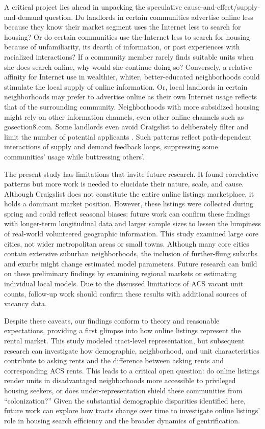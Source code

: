 \documentclass[11pt,letterpaper]{article}
\begin{document}
A critical project lies ahead in unpacking the speculative cause-and-effect/supply-and-demand question. Do landlords in certain communities advertise online less because they know their market segment uses the Internet less to search for housing? Or do certain communities use the Internet less to search for housing because of unfamiliarity, its dearth of information, or past experiences with racialized interactions? If a community member rarely finds suitable units when she does search online, why would she continue doing so? Conversely, a relative affinity for Internet use in wealthier, whiter, better-educated neighborhoods could stimulate the local supply of online information. Or, local landlords in certain neighborhoods may prefer to advertise online as their own Internet usage reflects that of the surrounding community. Neighborhoods with more subsidized housing might rely on other information channels, even other online channels such as gosection8.com. Some landlords even avoid Craigslist to deliberately filter and limit the number of potential applicants \citep{mendez_professional_2016}. Such patterns reflect path-dependent interactions of supply and demand feedback loops, suppressing some communities' usage while buttressing others'.

The present study has limitations that invite future research. It found correlative patterns but more work is needed to elucidate their nature, scale, and cause. Although Craigslist does not constitute the entire online listings marketplace, it holds a dominant market position. However, these listings were collected during spring and could reflect seasonal biases: future work can confirm these findings with longer-term longitudinal data and larger sample sizes to lessen the lumpiness of real-world volunteered geographic information. This study examined large core cities, not wider metropolitan areas or small towns. Although many core cities contain extensive suburban neighborhoods, the inclusion of further-flung suburbs and exurbs might change estimated model parameters. Future research can build on these preliminary findings by examining regional markets or estimating individual local models. Due to the discussed limitations of ACS vacant unit counts, follow-up work should confirm these results with additional sources of vacancy data.

Despite these caveats, our findings conform to theory and reasonable expectations, providing a first glimpse into how online listings represent the rental market. This study modeled tract-level representation, but subsequent research can investigate how demographic, neighborhood, and unit characteristics contribute to asking rents and the difference between asking rents and corresponding ACS rents. This leads to a critical open question: do online listings render units in disadvantaged neighborhoods more accessible to privileged housing seekers, or does under-representation shield these communities from \enquote{colonization?} Given the substantial demographic disparities identified here, future work can explore how tracts change over time to investigate online listings' role in housing search efficiency and the broader dynamics of gentrification.
\end{document}
